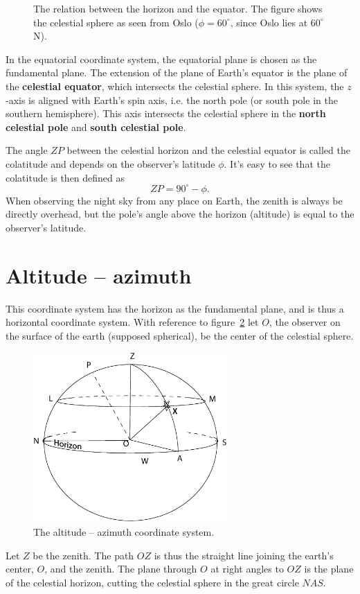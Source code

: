 %
\begin{figure}[htpb]
	\centering
	
	\caption{The relation between the horizon and the equator. The figure shows the
		celestial sphere as seen from Oslo ($\phi = 60^{\circ}$, since Oslo lies at 
		$60^{\circ}$ N).}
	\label{fig:cel-sph-test}
\end{figure}
%
In the equatorial coordinate system, the equatorial plane is chosen as the fundamental
plane. The extension of the plane of Earth's equator is the plane of the
\textbf{celestial equator},
which intersects the celestial sphere.
In this system, the $z$-axis is aligned with Earth's spin
axis, i.e. the north pole (or south pole in the southern hemisphere). This axis intersects
the celestial sphere in the \textbf{north celestial pole} and \textbf{south celestial pole}.

The angle $ZP$ between the celestial horizon and the celestial equator is called the
colatitude and depends on the
observer's latitude $\phi$. It's easy to see that the colatitude is then defined as
\[ ZP = 90^{\circ} - \phi. \]
When observing the night sky from any place on Earth, the
zenith is always be directly overhead, but the pole's angle above the horizon (altitude)
is equal to the observer's latitude.

\section{Altitude -- azimuth}

This coordinate system has the horizon as the fundamental plane, and is thus a horizontal
coordinate system.
With reference to figure~\ref{fig:alt-az} let $O$, the observer on
the surface of the earth (supposed spherical), be the center of the
celestial sphere. 
%
\begin{figure}[htpb]
\centering
\includegraphics[width=0.66\textwidth]{alt-az.eps}
\caption{The altitude -- azimuth coordinate system.}
\label{fig:alt-az}
\end{figure}
%
Let $Z$ be the zenith.
The path $OZ$ is thus the straight line joining
the earth's center, $O$, and the zenith. The plane through $O$ at right angles to
$OZ$ is the plane of the celestial horizon,
cutting the celestial sphere in the
great circle $NAS$.

